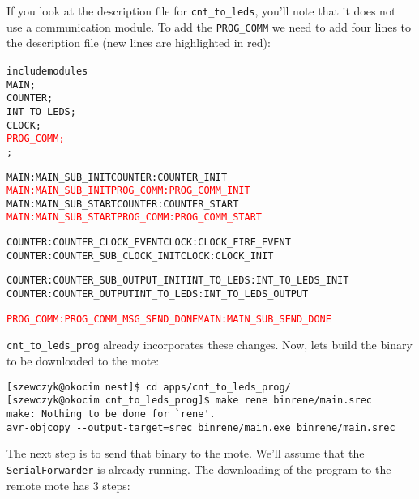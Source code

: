 \documentclass[12pt,fullpage]{article}
\newcommand{\component}[1]{{\tt #1}}
\newcommand{\application}[1]{{\tt #1}}
\begin{document}
If you look at the description file for \application{cnt\_to\_leds}, you'll
note that it does not use a communication module.  To add the
\component{PROG\_COMM} we need to add four lines to the description file (new
lines are highlighted in red):
\begin{small}
\begin{alltt}
include modules{
MAIN;
COUNTER;
INT_TO_LEDS;
CLOCK;
\textcolor{red}{PROG_COMM;}
};

MAIN:MAIN_SUB_INIT COUNTER:COUNTER_INIT
\textcolor{red}{MAIN:MAIN_SUB_INIT PROG_COMM:PROG_COMM_INIT}
MAIN:MAIN_SUB_START COUNTER:COUNTER_START
\textcolor{red}{MAIN:MAIN_SUB_START PROG_COMM:PROG_COMM_START}

COUNTER:COUNTER_CLOCK_EVENT CLOCK:CLOCK_FIRE_EVENT
COUNTER:COUNTER_SUB_CLOCK_INIT CLOCK:CLOCK_INIT

COUNTER:COUNTER_SUB_OUTPUT_INIT INT_TO_LEDS:INT_TO_LEDS_INIT
COUNTER:COUNTER_OUTPUT INT_TO_LEDS:INT_TO_LEDS_OUTPUT

\textcolor{red}{PROG_COMM:PROG_COMM_MSG_SEND_DONE MAIN:MAIN_SUB_SEND_DONE}
\end{alltt}
\end{small}
\application{cnt\_to\_leds\_prog} already incorporates these changes. Now,
lets build the binary to be downloaded to the mote: 
\begin{small}
\begin{verbatim}
[szewczyk@okocim nest]$ cd apps/cnt_to_leds_prog/
[szewczyk@okocim cnt_to_leds_prog]$ make rene binrene/main.srec
make: Nothing to be done for `rene'.
avr-objcopy --output-target=srec binrene/main.exe binrene/main.srec
\end{verbatim}
\end{small}
The next step is to send that binary to the mote. We'll assume that the
{\tt SerialForwarder} is already running. The downloading of the program to
the remote mote has 3 steps: 
\end{document}

